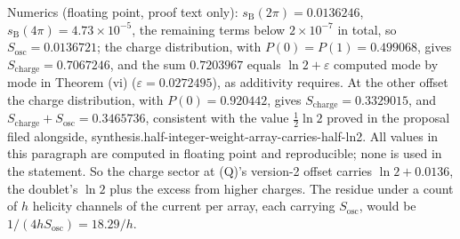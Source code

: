 Numerics (floating point, proof text only): $s_{\mathrm{B}}(2\pi) = 0.0136246$, $s_{\mathrm{B}}(4\pi) = 4.73 \times 10^{-5}$, the remaining terms below $2 \times 10^{-7}$ in total, so $S_{\mathrm{osc}} = 0.0136721$; the charge distribution, with $P(0) = P(1) = 0.499068$, gives $S_{\mathrm{charge}} = 0.7067246$, and the sum $0.7203967$ equals $\ln 2 + \varepsilon$ computed mode by mode in Theorem (vi) ($\varepsilon = 0.0272495$), as additivity requires. At the other offset the charge distribution, with $P(0) = 0.920442$, gives $S_{\mathrm{charge}} = 0.3329015$, and $S_{\mathrm{charge}} + S_{\mathrm{osc}} = 0.3465736$, consistent with the value $\tfrac12\ln 2$ proved in the proposal filed alongside, synthesis.half-integer-weight-array-carries-half-ln2. All values in this paragraph are computed in floating point and reproducible; none is used in the statement. So the charge sector at (Q)'s version-2 offset carries $\ln 2 + 0.0136$, the doublet's $\ln 2$ plus the excess from higher charges. The residue under a count of $h$ helicity channels of the current per array, each carrying $S_{\mathrm{osc}}$, would be $1/(4hS_{\mathrm{osc}}) = 18.29/h$.
